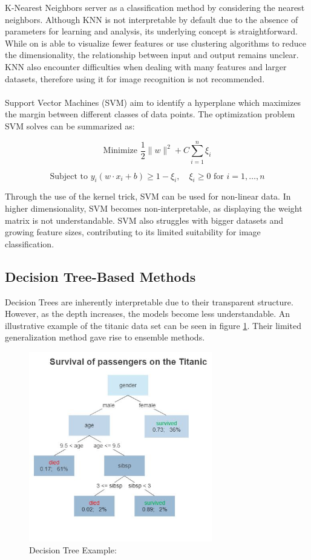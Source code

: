 K-Nearest Neighbors server as a classification method by considering the nearest neighbors. Although KNN is not interpretable by default due to the absence of parameters for learning and analysis, its underlying concept is straightforward. While on is able to visualize fewer features or use clustering algorithms to reduce the dimensionality, the relationship between input and output remains unclear. KNN also encounter difficulties when dealing with many features and larger datasets, therefore using it for image recognition is not recommended.
\\\\
Support Vector Machines (SVM) aim to identify a hyperplane which maximizes the margin between different classes of data points. The optimization problem SVM solves can be summarized as:

$$\text{Minimize } \frac{1}{2} \|w\|^2 + C \sum_{i=1}^{n} \xi_i$$

$$\text{Subject to } y_i (w \cdot x_i + b) \geq 1 - \xi_i, \quad \xi_i \geq 0 \text{ for } i = 1, \ldots, n$$

Through the use of the kernel trick, SVM can be used for non-linear data. In higher dimensionality, SVM becomes non-interpretable, as displaying the weight matrix is not understandable. SVM also struggles with bigger datasets and growing feature sizes, contributing to its limited suitability for image classification.


\subsection{Decision Tree-Based Methods}
\label{decision_tree}

Decision Trees are inherently interpretable due to their transparent structure. However, as the depth increases, the models become less understandable. An illustrative  example of the titanic data set can be seen in figure \ref{fig:decision_tree}. Their limited generalization method gave rise to ensemble methods.

\begin{figure}[h!]
	\centering
	\includegraphics[width=80mm]{figs/Decision_Tree}
	\caption[Decision Tree Example]{Decision Tree Example: \cite{decisiontree}}
	\label{fig:decision_tree}
\end{figure}
 

